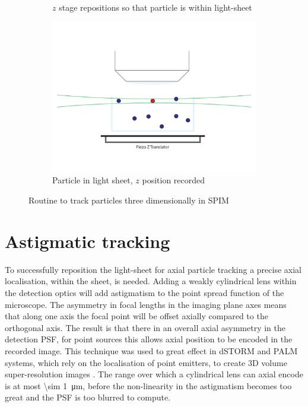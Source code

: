 \begin{figure}
\begin{subfigure}[b]{0.35\linewidth}
		\caption{\(z\) stage repositions so that particle is within light-sheet}
		\label{fig:SPIMSPT3}
	\end{subfigure}
	\begin{subfigure}[b]{0.35\linewidth}
		\centering
		\includegraphics[width=0.8\linewidth]{Chapters/spt/Figs/PDF/tracking/4_piezo_track}
		\caption{Particle in light sheet, \(z\) position recorded}
		\label{fig:SPIMSPT4}
	\end{subfigure}
	\caption{Routine to track particles three dimensionally in SPIM}
	\label{fig:SPIMSPT}
\end{figure}

\section{Astigmatic tracking}

To successfully reposition the light-sheet for axial particle tracking a %
precise axial localisation, within the sheet, is needed.
Adding a weakly cylindrical lens within the detection optics will add astigmatism to the point spread function of the microscope.
The asymmetry in focal lengths in the imaging plane axes %
means that along one axis the focal point will be offset axially compared to the orthogonal axis.
The result is that there in an overall axial asymmetry in the detection PSF, for point sources this allows axial position to be encoded in the recorded image.
This technique was used to great effect in dSTORM and PALM systems, which rely on the localisation of point emitters, to create 3D volume super-resolution images \cite{}.
The range over which a cylindrical lens can axial encode is at most \SI{\sim 1}{\micro\metre}, before the non-linearity in the astigmatism becomes too great and the PSF is too blurred to compute.

